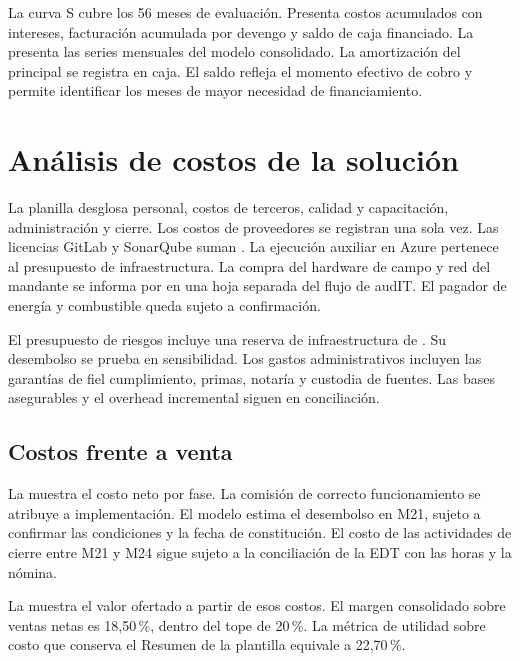 La curva S cubre los 56 meses de evaluación. Presenta costos acumulados con intereses, facturación acumulada por devengo y saldo de caja financiado. La  presenta las series mensuales del modelo consolidado. La amortización del principal se registra en caja. El saldo refleja el momento efectivo de cobro y permite identificar los meses de mayor necesidad de financiamiento.


\section{Análisis de costos de la solución}\label{sec:eco-costos}

La planilla desglosa personal, costos de terceros, calidad y capacitación, administración y cierre. Los costos de proveedores se registran una sola vez. Las licencias GitLab y SonarQube suman . La ejecución auxiliar en Azure pertenece al presupuesto de infraestructura. La compra del hardware de campo y red del mandante se informa por  en una hoja separada del flujo de audIT. El pagador de energía y combustible queda sujeto a confirmación.

El presupuesto de riesgos incluye una reserva de infraestructura de . Su desembolso se prueba en sensibilidad. Los gastos administrativos incluyen las garantías de fiel cumplimiento, primas, notaría y custodia de fuentes. Las bases asegurables y el overhead incremental siguen en conciliación.

\subsection{Costos frente a venta}\label{sec:eco-venta}

La  muestra el costo neto por fase. La comisión de correcto funcionamiento se atribuye a implementación. El modelo estima el desembolso en M21, sujeto a confirmar las condiciones y la fecha de constitución. El costo de las actividades de cierre entre M21 y M24 sigue sujeto a la conciliación de la EDT con las horas y la nómina.


La  muestra el valor ofertado a partir de esos costos. El margen consolidado sobre ventas netas es 18,50\,\%, dentro del tope de 20\,\%. La métrica de utilidad sobre costo que conserva el Resumen de la plantilla equivale a 22,70\,\%.

